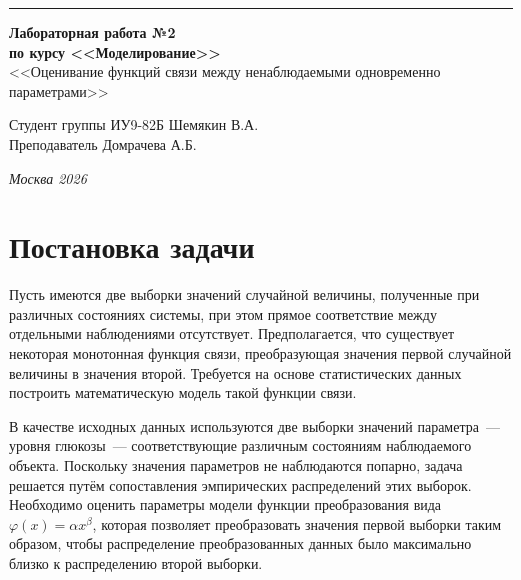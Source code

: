 \documentclass[a4paper, 14pt]{extarticle}
\begin{document}
\begin{titlepage}
\vspace*{-16pt}
\hspace{30pt}\rule{0.866\textwidth}{0.4pt}
  
\vspace{11em}

\begin{center}
\Large {\bf Лабораторная работа №2} \\ 
\large {\bf по курсу <<Моделирование>>} \\
\large <<Оценивание функций связи между ненаблюдаемыми одновременно параметрами>> 
\end{center}\normalsize

\vspace{8em}


\begin{flushright}
  {Студент группы ИУ9-82Б Шемякин В.А. \hspace*{15pt}\\ 
  \vspace{2ex}
  Преподаватель Домрачева А.Б.\hspace*{15pt}}
\end{flushright}

\bigskip

\vfill
 

\begin{center}
\textsl{Москва 2026}
\end{center}
\end{titlepage}

\renewcommand{\ttdefault}{pcr}

\setlength{\tabcolsep}{3pt}
\newpage
\setcounter{page}{2}
\section{Постановка задачи}

Пусть имеются две выборки значений случайной величины, полученные при различных состояниях системы, при этом прямое соответствие между отдельными наблюдениями отсутствует. Предполагается, что существует некоторая монотонная функция связи, преобразующая значения первой случайной величины в значения второй. Требуется на основе статистических данных построить математическую модель такой функции связи.

В качестве исходных данных используются две выборки значений параметра~--- уровня глюкозы~--- соответствующие различным состояниям наблюдаемого объекта. Поскольку значения параметров не наблюдаются попарно, задача решается путём сопоставления эмпирических распределений этих выборок. Необходимо оценить параметры модели функции преобразования вида $\varphi(x) = \alpha x^{\beta}$, которая позволяет преобразовать значения первой выборки таким образом, чтобы распределение преобразованных данных было максимально близко к распределению второй выборки.
\end{document}
